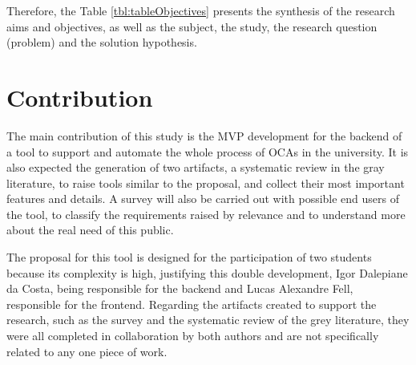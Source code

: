 
Therefore, the Table \ref{tbl:tableObjectives} presents the synthesis of the research aims and objectives, as well as the subject, the study, the research question (problem) and the solution hypothesis.



\section{Contribution}\label{sec:contribution}




The main contribution of this study is the \ac{MVP} development for the backend of a tool to support and automate the whole process of \aclp{OCA} in the university.
It is also expected the generation of two artifacts, a systematic review in the gray literature, to raise tools similar to the proposal, and collect their most important features and details.
A survey will also be carried out with possible end users of the tool, to classify the requirements raised by relevance and to understand more about the real need of this public.

The proposal for this tool is designed for the participation of two students because its complexity is high, justifying this double development, Igor Dalepiane da Costa, being responsible for the backend and Lucas Alexandre Fell, responsible for the frontend. Regarding the artifacts created to support the research, such as the survey and the systematic review of the grey literature, they were all completed in collaboration by both authors and are not specifically related to any one piece of work.

